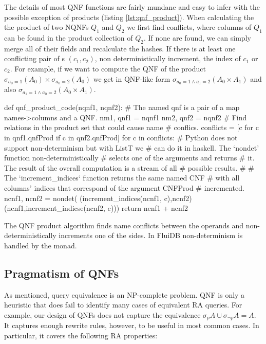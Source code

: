 The details of most QNF functions are fairly mundane and easy to infer
with the possible exception of products (listing
\ref{lst:qnf_product}). When calculating the the product of two NQNFs
\(Q_1\) and \(Q_2\) we first find conflicts, where columns of \(Q_1\)
can be found in the product collection of \(Q_2\). If none are found,
we can simply merge all of their fields and recalculate the hashes.
If there is at least one conflicting pair of s
\((c_1,c_2)\), non deterministically increment, the index of \(c_1\) or
\(c_2\). For example, if we want to compute the QNF of the product
\(\sigma_{a_0=1}(A_0) \times \sigma_{a_0=2}(A_0)\) we get in QNF-like
form \(\sigma_{a_0=1 \land a_1=2} (A_0 \times A_1)\) and also
\(\sigma_{a_1=1 \land a_0=2} (A_0 \times A_1)\).

\begin{code}
  \begin{pycode}
    def qnf_product_code(nqnf1, nqnf2):
        # The named qnf is a pair of a map names->columns and a QNF.
        nm1, qnf1 = nqnf1
        nm2, qnf2 = nqnf2
        # Find relations in the product set that could cause name
        # conflics.
        conflicts = [c for c in qnf1.qnfProd if c in qnf2.qnfProd]
        for c in conflicts:
            # Python does not support non-determinism but with ListT we
            # can do it in haskell. The `nondet' function non-deterministically
            # selects one of the arguments and returns
            # it. The result of the overall computation is a stream of all
            # possible results.
            #
            # The `increment_indices` function returns the same named CNF
            # with all columns' indices that correspond of the argument CNFProd
            # incremented.
            ncnf1, ncnf2 = nondet(
                (increment_indices(ncnf1, c),ncnf2)
                (ncnf1,increment_indicse(ncnf2, c)))
        return ncnf1 + ncnf2
\end{pycode}
  \caption{\label{lst:qnf_product}The QNF product algorithm finds name conflicts between the
    operands and non-deterministically increments one of the sides. In
    FluiDB non-determinism is handled by the  monad.}
\end{code}

\subsection{Pragmatism of QNFs}

As mentioned, query equivalence is an NP-complete problem. QNF is only
a heuristic that does fail to identify many cases of equivalent RA
queries.  For example, our design of QNFs does not capture the
equivalence \(\sigma_p A \cup \sigma_{\neg p} A = A\). It captures
enough rewrite rules, however, to be useful in most common cases. In
particular, it covers the following RA properties:

